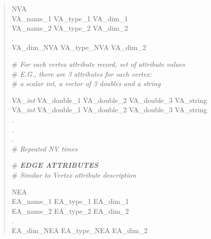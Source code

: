 \documentclass[12pt]{article}
\begin{document}
\begin{verse}
NVA \hspace{0.5ex} \\
VA\_name\_1 \hspace{0.5ex} VA\_type\_1 \hspace{0.5ex} VA\_dim\_1 \\ 
VA\_name\_2 \hspace{0.5ex} VA\_type\_2 \hspace{0.5ex} VA\_dim\_2 \\
. \\
VA\_dim\_NVA \hspace{0.5ex} VA\_type\_NVA \hspace{0.5ex} VA\_dim\_2  
\vspace{1ex}

\# \textit{For each vertex attribute record, set of attribute values} \\
\# \textit{E.G., there are 3 attributes for each vertex:} \\
\# \textit{a scalar int, a vector of 3 doubles and a string}

VA\_\textit{int} \hspace{0.5ex} VA\_double\_1 \hspace{0.5ex} VA\_double\_2 \hspace{0.5ex} VA\_double\_3 \hspace{0.5ex} VA\_string \\
VA\_\textit{int} \hspace{0.5ex} VA\_double\_1 \hspace{0.5ex} VA\_double\_2 \hspace{0.5ex} VA\_double\_3 \hspace{0.5ex} VA\_string \\
. \\
. \\
. \\
\# \textit{Repeated NV times}
\vspace{2ex}

\newpage
\# \textit{\textbf{EDGE ATTRIBUTES}} \\
\# \textit{Similar to Vertex attribute description}
\vspace{1ex}

NEA \hspace{0.5ex} \\
EA\_name\_1 \hspace{0.5ex} EA\_type\_1 \hspace{0.5ex} EA\_dim\_1 \\ 
EA\_name\_2 \hspace{0.5ex} EA\_type\_2 \hspace{0.5ex} EA\_dim\_2 \\
. \\
EA\_dim\_NEA \hspace{0.5ex} EA\_type\_NEA \hspace{0.5ex} EA\_dim\_2  
\vspace{1ex}


\end{verse}
\end{document}

